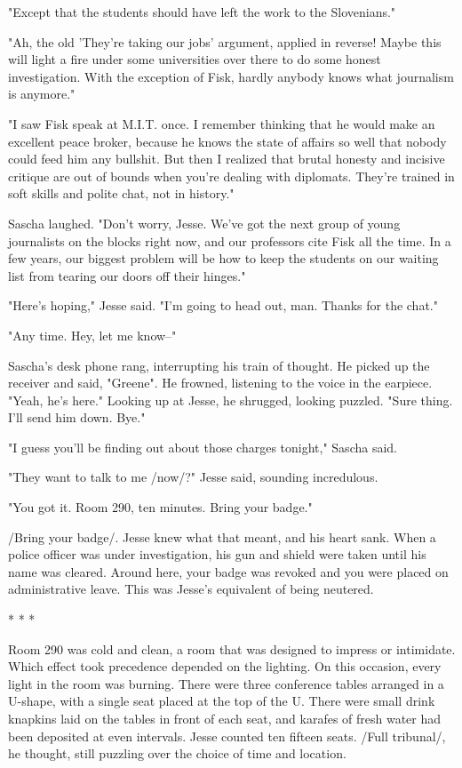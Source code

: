 "Except that the students should have left the work to the Slovenians."

"Ah, the old 'They're taking our jobs' argument, applied in reverse!  Maybe this will light a fire under some universities over there to do some honest investigation.  With the exception of Fisk, hardly anybody knows what journalism is anymore."

"I saw Fisk speak at M.I.T. once.  I remember thinking that he would make an excellent peace broker, because he knows the state of affairs so well that nobody could feed him any bullshit.  But then I realized that brutal honesty and incisive critique are out of bounds when you're dealing with diplomats.  They're trained in soft skills and polite chat, not in history."

Sascha laughed.  "Don't worry, Jesse.  We've got the next group of young journalists on the blocks right now, and our professors cite Fisk all the time.  In a few years, our biggest problem will be how to keep the students on our waiting list from tearing our doors off their hinges."

"Here's hoping," Jesse said.  "I'm going to head out, man.  Thanks for the chat."

"Any time.  Hey, let me know--"

Sascha's desk phone rang, interrupting his train of thought.  He picked up the receiver and said, "Greene".  He frowned, listening to the voice in the earpiece.  "Yeah, he's here."  Looking up at Jesse, he shrugged, looking puzzled.  "Sure thing.  I'll send him down.  Bye."

"I guess you'll be finding out about those charges tonight," Sascha said.

"They want to talk to me /now/?" Jesse said, sounding incredulous.

"You got it.  Room 290, ten minutes.  Bring your badge."

/Bring your badge/.  Jesse knew what that meant, and his heart sank.  When a police officer was under investigation, his gun and shield were taken until his name was cleared.  Around here, your badge was revoked and you were placed on administrative leave.  This was Jesse's equivalent of being neutered.

										* * *
										
Room 290 was cold and clean, a room that was designed to impress or intimidate.  Which effect took precedence depended on the lighting.  On this occasion, every light in the room was burning.  There were three conference tables arranged in a U-shape, with a single seat placed at the top of the U.  There were small drink knapkins laid on the tables in front of each seat, and karafes of fresh water had been deposited at even intervals.  Jesse counted ten fifteen seats.  /Full tribunal/, he thought, still puzzling over the choice of time and location.

